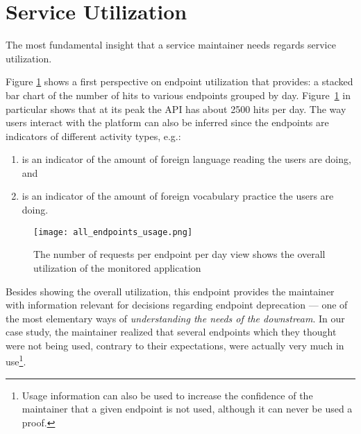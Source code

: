 
\section{Service Utilization}
\label{sec:util}

  The most fundamental insight that a service maintainer needs regards service utilization. %

  Figure \ref{fig:aeu} shows a first perspective on endpoint utilization that \tool provides: a stacked bar chart of the number of hits to various endpoints grouped by day. Figure~\ref{fig:aeu} in particular shows that at its peak the API has about 2500 hits per day. 
  The way users interact with the platform can also be inferred since the endpoints are indicators of different activity types, e.g.: 

  \begin{enumerate}

    \item {\color{myblue}\epTranslations} is an indicator of the amount of foreign language reading the users are doing, and 

    \item {\color{myviolet} \epOutcome} is an indicator of the amount of foreign vocabulary practice the users are doing.

  \end{enumerate}


  \begin{figure}[!ht]
    \centering
    \texttt{[image: all\_endpoints\_usage.png]}
    \caption{The number of requests per endpoint per day view shows the overall utilization of the monitored application}
    \label{fig:aeu}
  \end{figure}

  Besides showing the overall utilization, this endpoint provides the maintainer with information relevant for decisions regarding endpoint deprecation --- one of the most elementary ways of {\em understanding the needs of the downstream}\cite{Haen14a}. In our case study, the maintainer realized that several endpoints which they thought were not being used, contrary to their expectations, were actually very much in use\footnote{Usage information can also be used to increase the confidence of the maintainer that a given endpoint is not used, although it can never be used a proof.}.

  \niceseparator


